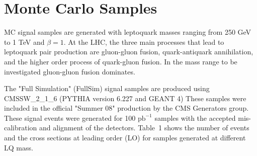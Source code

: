 
%

\section{Monte Carlo Samples} \label{sec:MCSamples}



MC signal samples are generated with leptoquark masses ranging from 250 GeV to 1 TeV and $\beta=1$. 
At the LHC, the three main processes that lead to leptoquark pair production are gluon-gluon fusion, 
quark-antiquark annihilation, and the higher order process of quark-gluon fusion. In the mass range to be investigated gluon-gluon fusion dominates. 

The "Full Simulation" (FullSim) signal samples are produced using 
CMSSW\_2\_1\_6 (PYTHIA version 6.227 and GEANT 4) 
These samples were included in the official "Summer 08" production by the CMS Generators group.
These signal events were generated for 100 $\mbox{pb}^{-1}$ samples with the accepted mis-calibration and alignment 
of the detectors. Table~1
shows the number of events and the cross sections at leading order (LO) for samples generated at different LQ mass.

